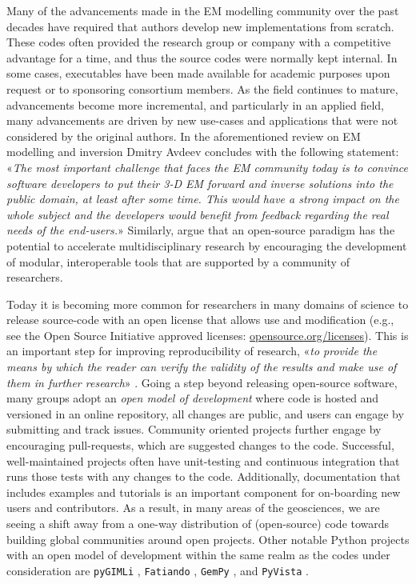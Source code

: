 \documentclass[extra, camera,%
]{gji}
\begin{document}
Many of the advancements made in the EM modelling community over the past decades have required that authors develop new implementations from scratch. These codes often provided the research group or company with a competitive advantage for a time, and thus the source codes were normally kept internal. In some cases, executables have been made available for academic purposes upon request or to sponsoring consortium members. As the field continues to mature, advancements become more incremental, and particularly in an applied field, many advancements are driven by new use-cases and applications that were not considered by the original authors. In the aforementioned review on EM modelling and inversion Dmitry Avdeev concludes with the following statement: «\emph{The most important challenge that faces the EM community today is to convince software developers to put their 3-D EM forward and inverse solutions into the public domain, at least after some time. This would have a strong impact on the whole subject and the developers would benefit from feedback regarding the real needs of the end-users.}» Similarly, \cite{EXG.19.Oldenburg} argue that an open-source paradigm has the potential to accelerate multidisciplinary research by encouraging the development of modular, interoperable tools that are supported by a community of researchers.

Today it is becoming more common for researchers in many domains of science to release source-code with an open license that allows use and modification (e.g., see the Open Source Initiative approved licenses: \href{https://opensource.org/licenses}{opensource.org/licenses}). This is an important step for improving reproducibility of research, «\emph{to provide the means by which the reader can verify the validity of the results and make use of them in further research}» \citep{GEO.17.Broggini}. Going a step beyond releasing open-source software, many groups adopt an \emph{open model of development} where code is hosted and versioned in an online repository, all changes are public, and users can engage by submitting and track issues. Community oriented projects further engage by encouraging pull-requests, which are suggested changes to the code. Successful, well-maintained projects often have unit-testing and continuous integration that runs those tests with any changes to the code. Additionally, documentation that includes examples and tutorials is an important component for on-boarding new users and contributors. As a result, in many areas of the geosciences, we are seeing a shift away from a one-way distribution of (open-source) code towards building global communities around open projects. Other notable Python projects with an open model of development within the same realm as the codes under consideration are \texttt{pyGIMLi} \citep{CAG.17.Rucker}, \texttt{Fatiando} \citep{JOSS.18.Uieda}, \texttt{GemPy} \citep{GMD.19.DeLaVarga}, and \texttt{PyVista} \citep{JOSS.19.Sullivan}.
\end{document}

